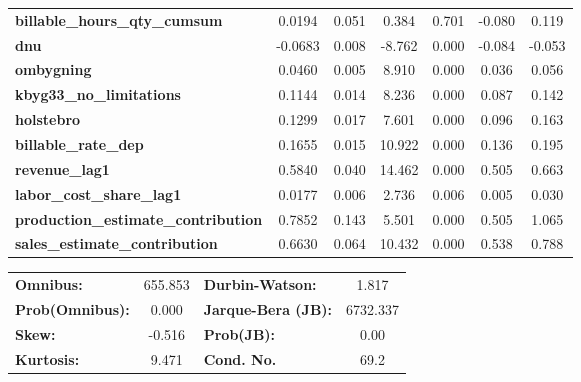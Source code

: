 \begin{center}
\begin{tabular}{lcccccc}
\textbf{billable\_hours\_qty\_cumsum}       &       0.0194  &        0.051     &     0.384  &         0.701        &       -0.080    &        0.119     \\
\textbf{dnu}                                &      -0.0683  &        0.008     &    -8.762  &         0.000        &       -0.084    &       -0.053     \\
\textbf{ombygning}                          &       0.0460  &        0.005     &     8.910  &         0.000        &        0.036    &        0.056     \\
\textbf{kbyg33\_no\_limitations}            &       0.1144  &        0.014     &     8.236  &         0.000        &        0.087    &        0.142     \\
\textbf{holstebro}                          &       0.1299  &        0.017     &     7.601  &         0.000        &        0.096    &        0.163     \\
\textbf{billable\_rate\_dep}                &       0.1655  &        0.015     &    10.922  &         0.000        &        0.136    &        0.195     \\
\textbf{revenue\_lag1}                      &       0.5840  &        0.040     &    14.462  &         0.000        &        0.505    &        0.663     \\
\textbf{labor\_cost\_share\_lag1}           &       0.0177  &        0.006     &     2.736  &         0.006        &        0.005    &        0.030     \\
\textbf{production\_estimate\_contribution} &       0.7852  &        0.143     &     5.501  &         0.000        &        0.505    &        1.065     \\
\textbf{sales\_estimate\_contribution}      &       0.6630  &        0.064     &    10.432  &         0.000        &        0.538    &        0.788     \\
\bottomrule
\end{tabular}
\begin{tabular}{lclc}
\textbf{Omnibus:}       & 655.853 & \textbf{  Durbin-Watson:     } &    1.817  \\
\textbf{Prob(Omnibus):} &   0.000 & \textbf{  Jarque-Bera (JB):  } & 6732.337  \\
\textbf{Skew:}          &  -0.516 & \textbf{  Prob(JB):          } &     0.00  \\
\textbf{Kurtosis:}      &   9.471 & \textbf{  Cond. No.          } &     69.2  \\
\bottomrule
\end{tabular}
\end{center}